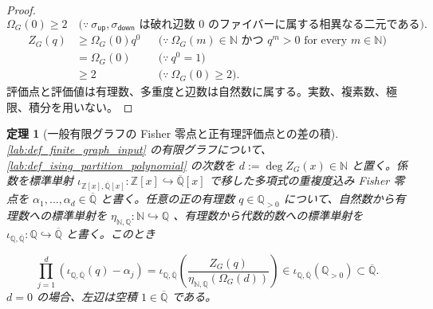 \documentclass[11pt,a4paper]{article}
\newtheorem{theorem}[definition]{定理}
\theoremstyle{remark}
\begin{document}
\begin{proof}
\[\Omega_G(0)
\ge 2
\quad\bigl(\because\ \sigma_{\mathsf{up}},\sigma_{\mathsf{down}}\text{ は破れ辺数 }0\text{ のファイバーに属する相異なる二元である}\bigr).\]
\[\begin{aligned}
Z_G(q)
&\ge \Omega_G(0)q^0
&&\bigl(\because\ \Omega_G(m)\in\mathbb N\text{ かつ }q^m>0\text{ for every }m\in\mathbb N\bigr)\\
&=\Omega_G(0)
&&\bigl(\because\ q^0=1\bigr)\\
&\ge2
&&\bigl(\because\ \Omega_G(0)\ge2\bigr).
\end{aligned}\]
評価点と評価値は有理数、多重度と辺数は自然数に属する。実数、複素数、極限、積分を用いない。

\end{proof}

\begin{theorem}[一般有限グラフの Fisher 零点と正有理評価点との差の積]\label{lab:theorem_fisher_zero_positive_rational_shifted_product_coefficient_ratio}
\cref{lab:def_finite_graph_input}
 の有限グラフについて、
\cref{lab:def_ising_partition_polynomial}
 の次数を
$d:=\deg Z_G(x)\in\mathbb N$
 と置く。係数を標準単射
$\iota_{\mathbb Z[x],\overline{\mathbb Q}[x]}:\mathbb Z[x]\hookrightarrow\overline{\mathbb Q}[x]$
 で移した多項式の重複度込み Fisher 零点を
$\alpha_1,\ldots,\alpha_d\in\overline{\mathbb Q}$
 と書く。任意の正の有理数
$q\in\mathbb Q_{>0}$
 について、自然数から有理数への標準単射を
$\eta_{\mathbb N,\mathbb Q}:\mathbb N\hookrightarrow\mathbb Q$
、有理数から代数的数への標準単射を
$\iota_{\mathbb Q,\overline{\mathbb Q}}:\mathbb Q\hookrightarrow\overline{\mathbb Q}$
 と書く。このとき

\[\prod_{j=1}^{d}\left(\iota_{\mathbb Q,\overline{\mathbb Q}}(q)-\alpha_j\right)
=
\iota_{\mathbb Q,\overline{\mathbb Q}}\!\left(
  \frac{
    Z_G(q)
  }{
    \eta_{\mathbb N,\mathbb Q}(\Omega_G(d))
  }
\right)
\in\iota_{\mathbb Q,\overline{\mathbb Q}}(\mathbb Q_{>0})
\subset\overline{\mathbb Q}.\]
$d=0$
 の場合、左辺は空積
$1\in\overline{\mathbb Q}$
 である。

\end{theorem}
\end{document}
